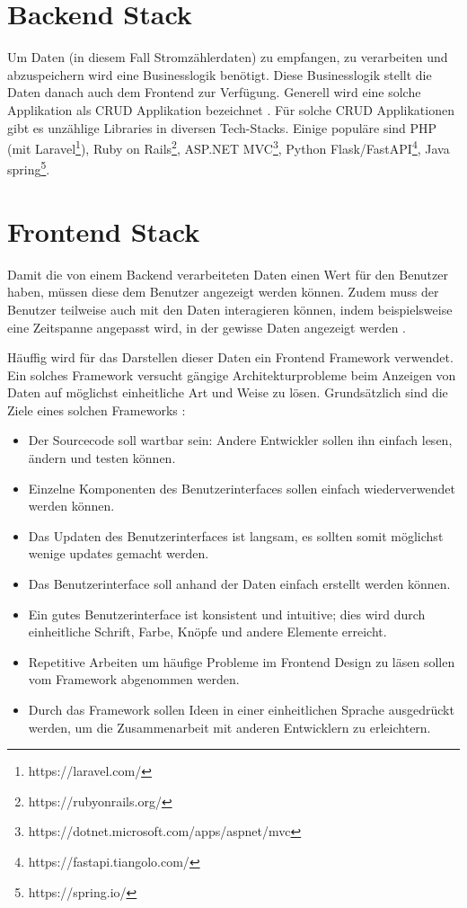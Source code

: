 \section{Backend Stack}
\label{state:backend}

Um Daten (in diesem Fall Stromzählerdaten) zu empfangen, zu verarbeiten und abzuspeichern
wird eine Businesslogik benötigt. Diese Businesslogik stellt die Daten
danach auch dem Frontend zur Verfügung. Generell wird eine solche Applikation als \ac{CRUD} Applikation
bezeichnet \parencite{sulemani_2021} \parencite{johnston_2021}.
Für solche \ac{CRUD} Applikationen gibt es unzählige Libraries in diversen Tech-Stacks.
Einige populäre sind PHP (mit Laravel\footnote{https://laravel.com/}),
Ruby on Rails\footnote{https://rubyonrails.org/}, ASP.NET MVC\footnote{https://dotnet.microsoft.com/apps/aspnet/mvc},
Python Flask/FastAPI\footnote{https://fastapi.tiangolo.com/}, Java spring\footnote{https://spring.io/}.


\section{Frontend Stack}
\label{state:frontend}

Damit die von einem Backend verarbeiteten Daten einen Wert für den Benutzer haben, müssen diese
dem Benutzer angezeigt werden können. Zudem muss der Benutzer teilweise auch mit den
Daten interagieren können, indem beispielsweise eine Zeitspanne angepasst wird, in
der gewisse Daten angezeigt werden \parencite{anokhina_2019}.

Häuffig wird für das Darstellen dieser Daten ein Frontend Framework verwendet.
Ein solches Framework versucht gängige Architekturprobleme beim Anzeigen von Daten auf möglichst einheitliche Art und Weise
zu lösen. Grundsätzlich sind die Ziele eines solchen Frameworks \parencite{do-i-need-a-frontend-fwk}:

\begin{itemize}
    \item Der Sourcecode soll wartbar sein: Andere Entwickler sollen ihn einfach lesen, ändern und testen können.
    \item Einzelne Komponenten des Benutzerinterfaces sollen einfach wiederverwendet werden können.
    \item Das Updaten des Benutzerinterfaces ist langsam, es sollten somit möglichst wenige updates gemacht werden.
    \item Das Benutzerinterface soll anhand der Daten einfach erstellt werden können.
    \item Ein gutes Benutzerinterface ist konsistent und intuitive; dies wird durch einheitliche Schrift, Farbe, Knöpfe und andere Elemente erreicht.
    \item Repetitive Arbeiten um häufige Probleme im Frontend Design zu läsen sollen vom Framework abgenommen werden.
    \item Durch das Framework sollen Ideen in einer einheitlichen Sprache ausgedrückt werden,
    um die Zusammenarbeit mit anderen Entwicklern zu erleichtern.
\end{itemize}

